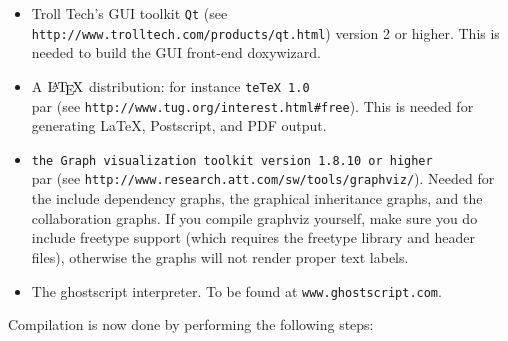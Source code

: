 \begin{itemize}
\item Troll Tech's GUI toolkit {\tt Qt} (see {\tt http://www.trolltech.com/products/qt.html}) version 2 or higher. This is needed to build the GUI front-end doxywizard. \item A $\mbox{\LaTeX}$ distribution: for instance {\tt te\-Te\-X 1.0}  \\par (see {\tt http://www.tug.org/interest.html\#free}). This is needed for generating La\-Te\-X, Postscript, and PDF output. \item {\tt the Graph visualization toolkit version 1.8.10 or higher}  \\par (see {\tt http://www.research.att.com/sw/tools/graphviz/}). Needed for the include dependency graphs, the graphical inheritance graphs, and the collaboration graphs. If you compile graphviz yourself, make sure you do include freetype support (which requires the freetype library and header files), otherwise the graphs will not render proper text labels. \item The ghostscript interpreter. To be found at {\tt www.ghostscript.com}. \end{itemize}


Compilation is now done by performing the following steps:


